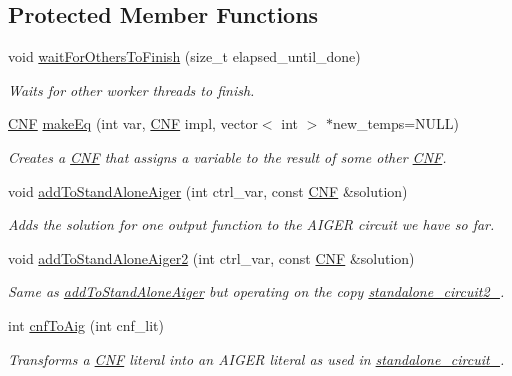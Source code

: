 \subsection*{Protected Member Functions}
\begin{DoxyCompactItemize}
\item 
void \hyperlink{classParExtractorWorker_a1c935793adbc70d77bbb8f7f065d0897}{wait\-For\-Others\-To\-Finish} (size\-\_\-t elapsed\-\_\-until\-\_\-done)
\begin{DoxyCompactList}\small\item\em Waits for other worker threads to finish. \end{DoxyCompactList}\item 
\hyperlink{classCNF}{C\-N\-F} \hyperlink{classParExtractorWorker_a11c63bb36f33129cbc437f10c4dca34e}{make\-Eq} (int var, \hyperlink{classCNF}{C\-N\-F} impl, vector$<$ int $>$ $\ast$new\-\_\-temps=N\-U\-L\-L)
\begin{DoxyCompactList}\small\item\em Creates a \hyperlink{classCNF}{C\-N\-F} that assigns a variable to the result of some other \hyperlink{classCNF}{C\-N\-F}. \end{DoxyCompactList}\item 
void \hyperlink{classParExtractorWorker_a3f9735c71053a92c4fe80281a7efe167}{add\-To\-Stand\-Alone\-Aiger} (int ctrl\-\_\-var, const \hyperlink{classCNF}{C\-N\-F} \&solution)
\begin{DoxyCompactList}\small\item\em Adds the solution for one output function to the A\-I\-G\-E\-R circuit we have so far. \end{DoxyCompactList}\item 
void \hyperlink{classParExtractorWorker_adbd795aa4646b093d90c29d253adfc79}{add\-To\-Stand\-Alone\-Aiger2} (int ctrl\-\_\-var, const \hyperlink{classCNF}{C\-N\-F} \&solution)
\begin{DoxyCompactList}\small\item\em Same as \hyperlink{classParExtractorWorker_a3f9735c71053a92c4fe80281a7efe167}{add\-To\-Stand\-Alone\-Aiger} but operating on the copy \hyperlink{classParExtractorWorker_a304c66039a45652e273876f7c6da8bcf}{standalone\-\_\-circuit2\-\_\-}. \end{DoxyCompactList}\item 
int \hyperlink{classParExtractorWorker_af32545578987bf8d7e2d6c09fb24e716}{cnf\-To\-Aig} (int cnf\-\_\-lit)
\begin{DoxyCompactList}\small\item\em Transforms a \hyperlink{classCNF}{C\-N\-F} literal into an A\-I\-G\-E\-R literal as used in \hyperlink{classParExtractorWorker_a233a7f99946695b0640e76ead6932fbb}{standalone\-\_\-circuit\-\_\-}. \end{DoxyCompactList}\item 

\end{DoxyCompactItemize}
